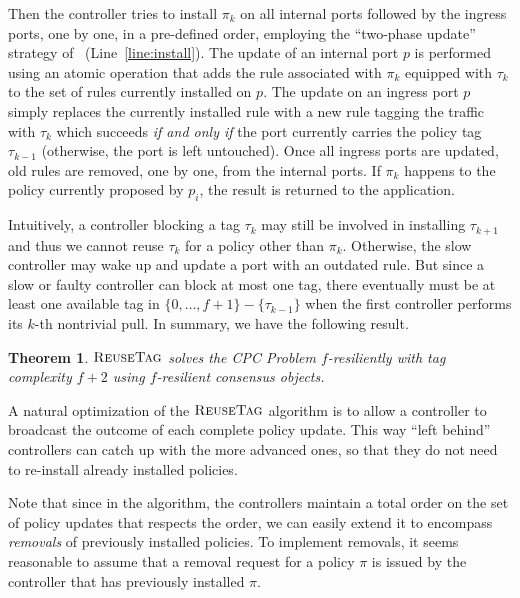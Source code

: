 \documentclass[11pt,pdftex,letter]{article}
\newcommand{\DPO}{\textsc{ReuseTag}}
\newcommand{\dom}{\textit{dom}}
\newtheorem{theorem}{Theorem}
\begin{document}
Then the controller tries to install $\pi_k$
  on all internal ports followed by the ingress ports, one by one, in
  a pre-defined order, employing the
``two-phase update'' strategy of~\cite{network-update} (Line~\ref{line:install}).
The update of an internal port $p$ is performed using an atomic operation
that adds the rule associated with $\pi_k$ equipped with $\tau_k$ to the set of
rules currently installed on $p$.
The update on an ingress port $p$ simply replaces the currently
installed rule with a new rule tagging the traffic with $\tau_k$ which succeeds \emph{if and
only if} the port currently carries the policy tag $\tau_{k-1}$
(otherwise, the port is left untouched).
%
Once all ingress ports are updated, old rules are removed, one by
one, from the internal ports.
If $\pi_k$ happens to the policy currently proposed by $p_i$, the result is returned to the application.

Intuitively, a controller blocking a tag $\tau_k$ may still be involved in
installing $\tau_{k+1}$ and thus we cannot reuse $\tau_k$ for a policy other
than $\pi_k$. Otherwise, the slow controller may wake up and update a
port with an outdated rule.
But since a slow or faulty controller can block at most one tag, there
eventually must be at least one available tag in $\{0,\ldots,f+1\}-\{\tau_{k-1}\}$
when the first controller performs its $k$-th nontrivial pull.
In summary, we have the following result.
\begin{theorem}\label{thm:lin}
$\DPO$ solves the CPC Problem $f$-resiliently with tag complexity
  $f+2$ using $f$-resilient consensus objects.
\end{theorem}
%
A natural optimization of the $\DPO$ algorithm is to allow a
controller to broadcast the outcome of each complete policy
update. This way ``left behind'' controllers can catch up with the more
advanced ones, so that they do not need to re-install already installed policies.

Note that since in the algorithm, the controllers maintain a
total order on the set of policy updates that respects the order, we can easily extend it to encompass \emph{removals} of previously
installed policies.
To implement removals, it seems reasonable to assume that a removal request for a policy
$\pi$ is issued by the controller that has previously installed $\pi$.
\end{document}
